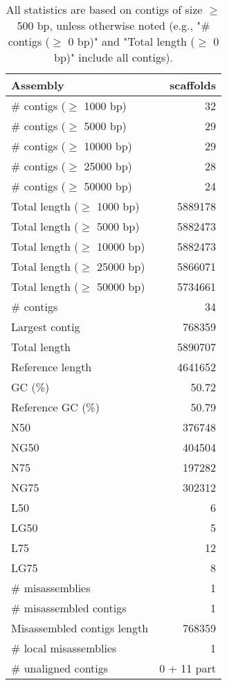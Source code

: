 \documentclass[12pt,a4paper]{article}
\begin{document}
\begin{table}[ht]
\begin{center}
\caption{All statistics are based on contigs of size $\geq$ 500 bp, unless otherwise noted (e.g., "\# contigs ($\geq$ 0 bp)" and "Total length ($\geq$ 0 bp)" include all contigs).}
\begin{tabular}{|l*{1}{|r}|}
\hline
Assembly & scaffolds \\ \hline
\# contigs ($\geq$ 1000 bp) & 32 \\ \hline
\# contigs ($\geq$ 5000 bp) & 29 \\ \hline
\# contigs ($\geq$ 10000 bp) & 29 \\ \hline
\# contigs ($\geq$ 25000 bp) & 28 \\ \hline
\# contigs ($\geq$ 50000 bp) & 24 \\ \hline
Total length ($\geq$ 1000 bp) & 5889178 \\ \hline
Total length ($\geq$ 5000 bp) & 5882473 \\ \hline
Total length ($\geq$ 10000 bp) & 5882473 \\ \hline
Total length ($\geq$ 25000 bp) & 5866071 \\ \hline
Total length ($\geq$ 50000 bp) & 5734661 \\ \hline
\# contigs & 34 \\ \hline
Largest contig & 768359 \\ \hline
Total length & 5890707 \\ \hline
Reference length & 4641652 \\ \hline
GC (\%) & 50.72 \\ \hline
Reference GC (\%) & 50.79 \\ \hline
N50 & 376748 \\ \hline
NG50 & 404504 \\ \hline
N75 & 197282 \\ \hline
NG75 & 302312 \\ \hline
L50 & 6 \\ \hline
LG50 & 5 \\ \hline
L75 & 12 \\ \hline
LG75 & 8 \\ \hline
\# misassemblies & 1 \\ \hline
\# misassembled contigs & 1 \\ \hline
Misassembled contigs length & 768359 \\ \hline
\# local misassemblies & 1 \\ \hline
\# unaligned contigs & 0 + 11 part \\ \hline

\end{tabular}
\end{center}
\end{table}
\end{document}
